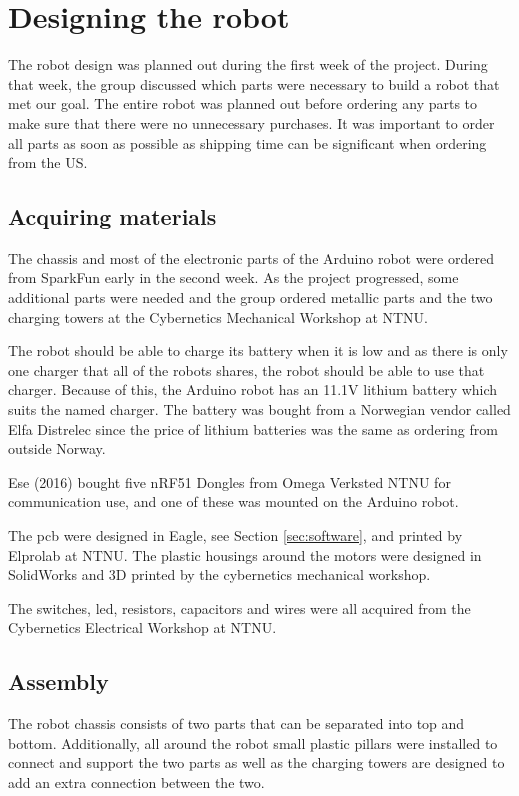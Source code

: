 \section{Designing the robot}
\label{sec:robotdesign}
The robot design was planned out during the first week of the project. During that week, the group discussed which parts were necessary to build a robot that met our goal. The entire robot was planned out before ordering any parts to make sure that there were no unnecessary purchases. It was important to order all parts as soon as possible as shipping time can be significant when ordering from the US.

\subsection{Acquiring materials}
The chassis and most of the electronic parts of the Arduino robot were ordered from SparkFun \cite{sparkfun} early in the second week. As the project progressed, some additional parts were needed and the group ordered metallic parts and the two charging towers at the Cybernetics Mechanical Workshop at NTNU.

The robot should be able to charge its battery when it is low and as there is only one charger that all of the robots shares, the robot should be able to use that charger. Because of this, the Arduino robot has an 11.1V lithium battery which suits the named charger. The battery was bought from a Norwegian vendor called Elfa Distrelec\cite{elfa} since the price of lithium batteries was the same as ordering from outside Norway.

Ese (2016) bought five nRF51 Dongles from Omega Verksted NTNU  for communication use, and one of these was mounted on the Arduino robot.

The \acrshort{pcb} were designed in Eagle, see Section \ref{sec:software}, and printed by Elprolab\cite{elprolab} at NTNU. The plastic housings around the motors were designed in SolidWorks and 3D printed by the cybernetics mechanical workshop.

The switches, \acrfull{led}, resistors, capacitors and wires were all acquired from the Cybernetics Electrical Workshop at NTNU.


\subsection{Assembly}
The robot chassis consists of two parts that can be separated into top and bottom. Additionally, all around the robot small plastic pillars were installed to connect and support the two parts as well as the charging towers are designed to add an extra connection between the two.

